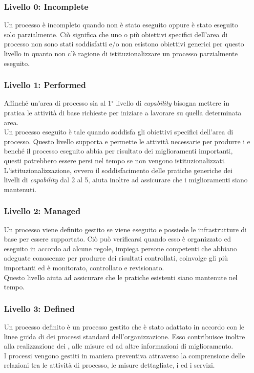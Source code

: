 \subsubsection{Livello 0: Incomplete}
Un processo è incompleto quando non è stato eseguito oppure è stato eseguito solo parzialmente. Ciò significa che uno o più obiettivi specifici dell'area di processo non sono stati soddisfatti e/o non esistono obiettivi generici per questo livello in quanto non c'è ragione di istituzionalizzare un processo parzialmente eseguito.

\subsubsection{Livello 1: Performed}
Affinché un'area di processo sia al 1$^{\circ}$ livello di \textit{capability} bisogna mettere in pratica
le attività di base richieste per iniziare a lavorare su quella determinata area. \\
Un processo eseguito è tale quando soddisfa gli obiettivi specifici dell'area di processo.
Questo livello supporta e permette le attività necessarie per produrre i  e benché il processo eseguito abbia per risultato dei miglioramenti importanti, questi
potrebbero essere persi nel tempo se non vengono istituzionalizzati. L'istituzionalizzazione, ovvero il soddisfacimento delle pratiche generiche dei livelli di \textit{capability} dal 2 al 5, aiuta inoltre ad assicurare che i miglioramenti siano mantenuti.

\subsubsection{Livello 2: Managed}
Un processo viene definito gestito se viene eseguito e possiede le infrastrutture di base per
essere supportato. Ciò può verificarsi quando esso è organizzato ed eseguito in accordo ad alcune regole, impiega persone competenti che abbiano adeguate conoscenze per produrre dei risultati controllati, coinvolge gli  più importanti ed è monitorato, controllato e revisionato. \\
Questo livello aiuta ad assicurare che le pratiche esistenti siano mantenute nel tempo.

\subsubsection{Livello 3: Defined}
Un processo definito è un processo gestito che è stato adattato in accordo con le linee guida di  dei processi standard dell'organizzazione. Esso contribuisce inoltre alla realizzazione dei , alle misure ed ad altre informazioni di miglioramento. \\
I processi vengono gestiti in maniera preventiva attraverso la comprensione delle relazioni tra le attività di processo, le misure dettagliate, i  ed i servizi.

